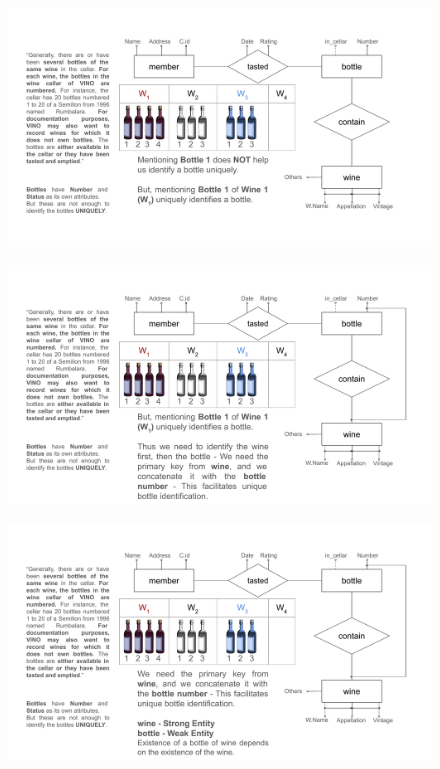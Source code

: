 \documentclass{beamer}
\begin{document}
\begin{frame}
    \begin{figure}
        \centering
        \includegraphics[width=1.1\linewidth]{tut_02_files/07.pdf}
    \end{figure}
\end{frame}

\begin{frame}
    \begin{figure}
        \centering
        \includegraphics[width=1.1\linewidth]{tut_02_files/08.pdf}
    \end{figure}
\end{frame}

\begin{frame}
    \begin{figure}
        \centering
        \includegraphics[width=1.1\linewidth]{tut_02_files/09.pdf}
    \end{figure}
\end{frame}
\end{document}
